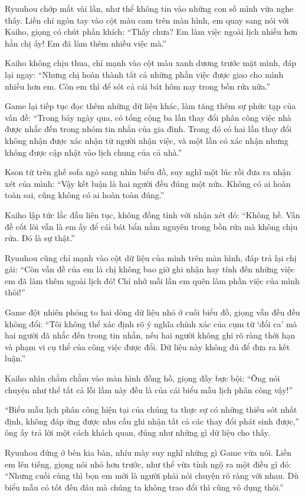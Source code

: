 \documentclass[../main.tex]{subfiles}
\begin{document}
Ryuuhou chớp mắt vài lần, như thể không tin vào những con số mình vừa nghe thấy. Liền chỉ ngón tay vào cột màu cam trên màn hình, em quay sang nói với Kaiho, giọng có chút phấn khích: ``Thấy chưa? Em làm việc ngoài lịch nhiều hơn hẳn chị ấy! Em đã làm thêm nhiều việc mà.''

Kaiho không chịu thua, chỉ mạnh vào cột màu xanh dương trước mặt mình, đáp lại ngay: ``Nhưng chị hoàn thành tất cả những phần việc được giao cho mình nhiều hơn em. Còn em thì để sót cả cái bát hôm nay trong bồn rửa nữa.''

Game lại tiếp tục đọc thêm những dữ liệu khác, làm tăng thêm sự phức tạp của vấn đề: ``Trong bảy ngày qua, có tổng cộng ba lần thay đổi phân công việc nhà được nhắc đến trong nhóm tin nhắn của gia đình. Trong đó có hai lần thay đổi không nhận được xác nhận từ người nhận việc, và một lần có xác nhận nhưng không được cập nhật vào lịch chung của cả nhà.''

Kson từ trên ghế sofa ngó sang nhìn biểu đồ, suy nghĩ một lúc rồi đưa ra nhận xét của mình: ``Vậy kết luận là hai người đều đúng một nửa. Không có ai hoàn toàn sai, cũng không có ai hoàn toàn đúng.''

Kaiho lập tức lắc đầu liên tục, không đồng tình với nhận xét đó: ``Không hề. Vấn đề cốt lõi vẫn là em ấy để cái bát bẩn nằm nguyên trong bồn rửa mà không chịu rửa. Đó là sự thật.''

Ryuuhou cũng chỉ mạnh vào cột dữ liệu của mình trên màn hình, đáp trả lại chị gái: ``Còn vấn đề của em là chị không bao giờ ghi nhận hay tính đến những việc em đã làm thêm ngoài lịch đó! Chỉ nhớ mỗi lần em quên làm phần việc của mình thôi!''

Game đột nhiên phóng to hai dòng dữ liệu nhỏ ở cuối biểu đồ, giọng vẫn đều đều không đổi: ``Tôi không thể xác định rõ ý nghĩa chính xác của cụm từ `đổi ca' mà hai người đã nhắc đến trong tin nhắn, nếu hai người không ghi rõ ràng thời hạn và phạm vi cụ thể của công việc được đổi. Dữ liệu này không đủ để đưa ra kết luận.''

Kaiho nhìn chằm chằm vào màn hình đồng hồ, giọng đầy bực bội: ``Ông nói chuyện như thể tất cả lỗi lầm này đều là của cái biểu mẫu lịch phân công vậy!''

``Biểu mẫu lịch phân công hiện tại của chúng ta thực sự có những thiếu sót nhất định, không đáp ứng được nhu cầu ghi nhận tất cả các thay đổi phát sinh được,'' ông ấy trả lời một cách khách quan, đúng như những gì dữ liệu cho thấy.

Ryuuhou đứng ở bên kia bàn, nhíu mày suy nghĩ những gì Game vừa nói. Liền em lên tiếng, giọng nói nhỏ hơn trước, như thể vừa tỉnh ngộ ra một điều gì đó: ``Nhưng cuối cùng thì bọn em mới là người phải nói chuyện rõ ràng với nhau. Dù biểu mẫu có tốt đến đâu mà chúng ta không trao đổi thì cũng vô dụng thôi.''
\end{document}

